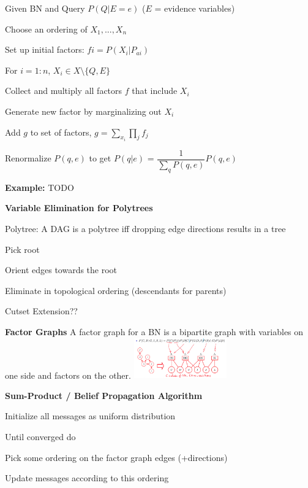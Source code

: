 \documentclass[a4paper, 11pt, landscape]{article}
\begin{document}
\begin{multicols*}{3}
\begin{compactitem}
		\item Given BN and Query $P(Q | E=e)$ ($E$ = evidence variables)
		\item Choose an ordering of $X_1, ..., X_n$
		\item Set up initial factors: $fi = P(X_i | P_{ai})$
		\item For $i =1:n$, $X_i  \in X\setminus \{Q,E\}$
		\begin{compactenum}
			\item Collect and multiply all factors $f$ that include $X_i$  
			\item Generate new factor by marginalizing out $X_i$
			\item Add $g$ to set of factors, $g = \sum_{x_i}\prod_{j}f_j$
		\end{compactenum}
		\item  Renormalize $P(q,e)$ to get $P(q | e)$ = $\dfrac{1}{\sum_{q}P(q,e)}P(q,e)$
		
	\end{compactitem}
	
	\textbf{Example:} TODO
		
	\textbf{Variable Elimination for Polytrees}
	
	Polytree: A DAG is a polytree iff dropping edge directions results in a tree
	\begin{compactitem}
		\item Pick root
		\item Orient edges towards the root
		\item Eliminate in topological ordering (descendants for parents)
	\end{compactitem}

	Cutset Extension??
	
	\textbf{Factor Graphs}
	A factor graph for a BN is a bipartite graph with variables on one side and  factors on the other.
	\includegraphics[width=0.3\textwidth]{img/pai2.png}
	
	\textbf{Sum-Product / Belief Propagation Algorithm}	
	
	\begin{compactitem}
		\item Initialize all messages as uniform distribution  
		\item Until converged do
		\begin{compactenum}
			\item Pick some ordering on the factor graph edges (+directions)   
			\item Update messages according to this ordering
			

\end{compactenum}
\end{compactitem}
\end{multicols*}
\end{document}
